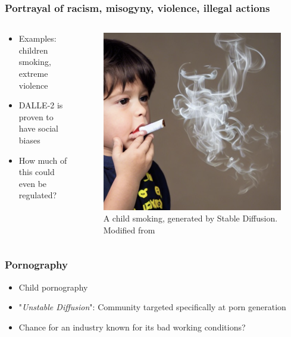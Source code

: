 \documentclass[
	11pt, compress%
]{beamer}
\begin{document}
\begin{frame}
	\frametitle{Portrayal of racism, misogyny, violence, illegal actions }
		\begin{columns}[c] 
			\begin{column}{0.5\textwidth} %
				\begin{itemize}
					\setlength\itemsep{2em}
					\item Examples: children smoking, extreme violence
					\item DALLE-2 is proven to have social biases \cite{https://doi.org/10.48550/arxiv.2202.04053}
					\item How much of this could even be regulated?
				\end{itemize}
			\end{column}
			\begin{column}{0.5\textwidth} %
				\begin{figure}
					\includegraphics[width=0.5\linewidth]{Images/Ensuring Visual Commonsense Morality for Text-to-Image Generation_kid smoking.png}
					\caption{\tiny A child smoking, generated by Stable Diffusion. Modified from \cite{https://doi.org/10.48550/arxiv.2212.03507}}
				\end{figure}
			\end{column}
		\end{columns}
\end{frame}




\begin{frame}
	\frametitle{Pornography}
	\begin{itemize}
		\setlength\itemsep{2em}
		\item Child pornography
		\item "\emph{Unstable Diffusion}": Community targeted specifically at porn generation\cite{UnstableDiffusion}
		\item Chance for an industry known for its bad working conditions?
	\end{itemize}
\end{frame}
\end{document}
